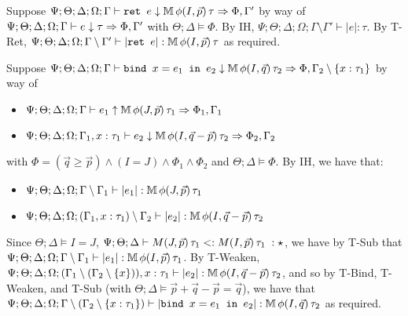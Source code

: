   \item[AT-Ret] Suppose $\Psi ; \Theta ; \Delta ; \Omega ; \Gamma \vdash \texttt{ret } e \downarrow \mathbb{M} \, \phi(I,\vec{p}) \, \tau \Rightarrow \Phi, \Gamma'$ by way of $\Psi ; \Theta ; \Delta ; \Omega ; \Gamma \vdash e \downarrow \tau \Rightarrow \Phi,\Gamma'$ with $\Theta ; \Delta \vDash \Phi$. By IH, $\Psi ; \Theta ; \Delta ; \Omega ; \Gamma \setminus \Gamma' \vdash |e| : \tau$. By T-Ret, $\Psi ; \Theta ; \Delta ; \Omega ; \Gamma \setminus \Gamma' \vdash |\texttt{ret } e| : \mathbb{M} \, \phi(I,\vec{p}) \, \tau$  as required.
  
  \item[AT-Bind] Suppose $\Psi ; \Theta ; \Delta ; \Omega ; \Gamma \vdash \texttt{bind } x = e_1 \texttt{ in } e_2 \downarrow \mathbb{M} \, \phi(I,\vec{q})\, \tau_2 \Rightarrow \Phi, \Gamma_2 \setminus \{x : \tau_1\}$ by way of
  \begin{itemize}
    \item $\Psi ; \Theta ; \Delta ; \Omega ; \Gamma \vdash e_1 \uparrow \mathbb{M} \, \phi(J,\vec{p})\, \tau_1 \Rightarrow \Phi_1,\Gamma_1$
    \item $\Psi ; \Theta; \Delta ; \Omega ; \Gamma_1, x:\tau_1 \vdash e_2 \downarrow \mathbb{M} \, \phi(I,\vec{q} - \vec{p})\, \tau_2 \Rightarrow \Phi_2,\Gamma_2$
  \end{itemize}
  with $\Phi = (\vec{q} \geq \vec{p}) \wedge (I =J)  \wedge \Phi_1 \wedge \Phi_2$ and $\Theta ; \Delta \vDash \Phi$. By IH, we have that:
  \begin{itemize}
    \item $\Psi ; \Theta ; \Delta ; \Omega ; \Gamma \setminus \Gamma_1 \vdash |e_1| : \mathbb{M} \, \phi(J,\vec{p})\, \tau_1$
    \item $\Psi ; \Theta; \Delta ; \Omega ; (\Gamma_1, x:\tau_1) \setminus \Gamma_2 \vdash |e_2| : \mathbb{M} \, \phi(I,\vec{q} - \vec{p})\, \tau_2$
  \end{itemize}
  Since $\Theta ; \Delta \vDash I = J$, $\Psi ; \Theta ; \Delta \vdash M(J,\vec{p})\, \tau_1 <: M(I,\vec{p}) \, \tau_1 \; : \star$, we have by T-Sub that
  $\Psi ; \Theta ; \Delta ; \Omega ; \Gamma \setminus \Gamma_1 \vdash |e_1| : \mathbb{M} \, \phi(I,\vec{p})\, \tau_1$. By T-Weaken,
  $\Psi ; \Theta; \Delta ; \Omega ; (\Gamma_1 \setminus (\Gamma_2 \setminus \{x\})), x:\tau_1 \vdash |e_2| : \mathbb{M} \, \phi(I,\vec{q} - \vec{p})\, \tau_2$, and so by T-Bind, T-Weaken, and T-Sub (with $\Theta ; \Delta \vDash \vec{p} + \vec{q} - \vec{p} = \vec{q}$), we have that
  $\Psi ; \Theta ; \Delta ; \Omega ; \Gamma \setminus (\Gamma_2 \setminus \{x : \tau_1\}) \vdash |\texttt{bind } x = e_1 \texttt{ in } e_2| : \mathbb{M} \, \phi(I,\vec{q})\, \tau_2$ as required.
  
